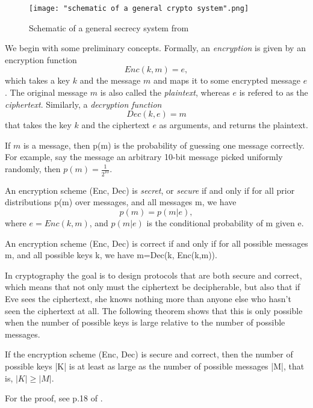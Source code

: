 \begin{figure}[h]
    \centering
    \texttt{[image: "schematic of a general crypto system".png]}
    \caption{Schematic of a general secrecy system from \cite{shannon1949communication}}
    \label{fig:general crypto schematic}
\end{figure}

We begin with some preliminary concepts.  Formally, an {\emph{encryption}} is given by an encryption function 
$$Enc(k,m)=e ,$$
which takes a key $k$ and the message $m$ and maps it to some encrypted message $e$. The original message $m$ is also called the {\emph{plaintext}}, whereas $e$ is refered to as the {\emph{ciphertext}}. Similarly, a {\emph{decryption function}} $$Dec(k,e)=m$$
that takes the key $k$ and the ciphertext $e$ as arguments, and returns the plaintext. 

If $m$ is a message, then p(m) is the probability of guessing one message correctly. For example, say the message an arbitrary 10-bit message picked uniformly randomly, then $p(m)=\frac{1}{2^10}$.
\begin{definition} \label{def: shannon}
An encryption scheme (Enc, Dec) is \textit{secret}, or \textit{secure} if and only if for all prior distributions p(m) over messages, and all messages m, we have
\begin{equation}
    p(m)=p(m|e),
\end{equation}
where $e=Enc(k,m)$, and $p(m|e)$ is the conditional probability of m given e.

An encryption scheme (Enc, Dec) is correct if and only if for all possible messages m, and all possible keys k, we have m=Dec(k, Enc(k,m)).
\end{definition}
In cryptography the goal is to design protocols that are both secure and correct, which means that not only must the ciphertext be decipherable, but also that if Eve sees the ciphertext, she knows nothing more than anyone else who hasn't seen the ciphertext at all. The following theorem shows that this is only possible when the number of possible keys is large relative to the number of possible messages.
\begin{theorem}
If the encryption scheme (Enc, Dec) is secure and correct, then the number of possible keys |K| is at least as large as the number of possible messages |M|, that is, $|K| \ge |M|$.
\end{theorem}
For the proof, see p.18 of \cite{Wehner:notes}. 

